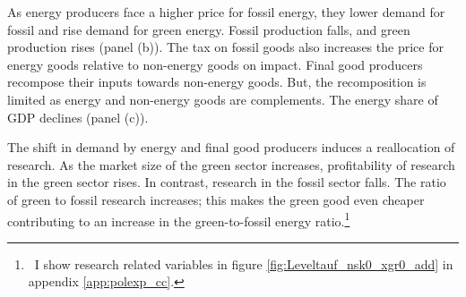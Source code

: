   As energy producers face a higher price for fossil energy, they lower demand for fossil and rise demand for green energy. Fossil production falls, and green production rises (panel (b)).
 The tax on fossil goods also increases the price for energy goods relative to non-energy goods on impact. Final good producers recompose their inputs towards non-energy goods. But, the recomposition is limited as energy and non-energy goods are complements. The energy share of GDP declines (panel (c)).  
 
 The shift in demand by energy and final good producers induces a reallocation of research. 
 As the market size of the green sector increases, profitability of research in the green sector rises. In contrast, research in the fossil sector falls. The ratio of green to fossil research increases; this makes the green good even cheaper contributing to an increase in the green-to-fossil energy ratio.\footnote{\  I show research related variables in figure \ref{fig:Leveltauf_nsk0_xgr0_add} in appendix \ref{app:polexp_cc}. 
 } 
 

